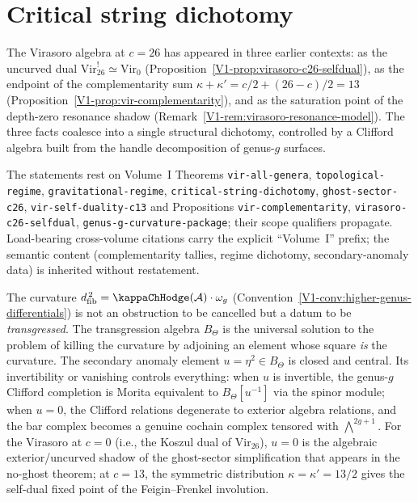 
\section{Critical string dichotomy}
\label{ch:thqg-critical-string}%

The Virasoro algebra at $c = 26$ has appeared in three earlier contexts:
as the uncurved dual $\mathrm{Vir}_{26}^! \simeq \mathrm{Vir}_0$
(Proposition~\ref{V1-prop:virasoro-c26-selfdual}),
as the endpoint of the complementarity sum
$\kappa + \kappa' = c/2 + (26-c)/2 = 13$
(Proposition~\ref{V1-prop:vir-complementarity}),
and as the saturation point of the depth-zero resonance shadow
(Remark~\ref{V1-rem:virasoro-resonance-model}).
The three facts coalesce into a single structural dichotomy,
controlled by a Clifford algebra built from the handle
decomposition of genus-$g$ surfaces.

\begin{remark}
The \ClaimStatusProvedHere{} statements rest on Volume~I
Theorems \texttt{vir-all-genera}, \texttt{topological-regime},
\texttt{gravitational-regime}, \texttt{critical-string-dichotomy},
\texttt{ghost-sector-c26}, \texttt{vir-self-duality-c13} and
Propositions \texttt{vir-complementarity},
\texttt{virasoro-c26-selfdual},
\texttt{genus-g-curvature-package}; their scope qualifiers
propagate. Load-bearing cross-volume citations carry the explicit
``Volume~I'' prefix; the semantic content
(complementarity tallies, regime dichotomy, secondary-anomaly
data) is inherited without restatement.
\end{remark}

The curvature $\dfib^{\,2} = \kappaChHodge(\cA) \cdot \omega_g$
(Convention~\ref{V1-conv:higher-genus-differentials})
is not an obstruction to be cancelled but a datum to be \emph{transgressed}.
The transgression algebra $B_\Theta$ is the universal solution to the
problem of killing the curvature by adjoining an element whose square
\emph{is} the curvature. The secondary anomaly element
$u = \eta^2 \in B_\Theta$ is closed and central. Its invertibility or
vanishing controls everything: when $u$ is invertible, the genus-$g$
Clifford completion is Morita equivalent to $B_\Theta[u^{-1}]$ via the
spinor module; when $u = 0$, the Clifford relations degenerate to
exterior algebra relations, and the bar complex becomes a genuine cochain
complex tensored with $\bigwedge^{2g+1}$. For the Virasoro at $c = 0$
(i.e., the Koszul dual of $\mathrm{Vir}_{26}$),
$u = 0$ is the algebraic exterior/uncurved shadow of the ghost-sector
simplification that appears in the no-ghost theorem;
at $c = 13$, the symmetric distribution $\kappa = \kappa' = 13/2$ gives
the self-dual fixed point of the Feigin--Frenkel involution.


